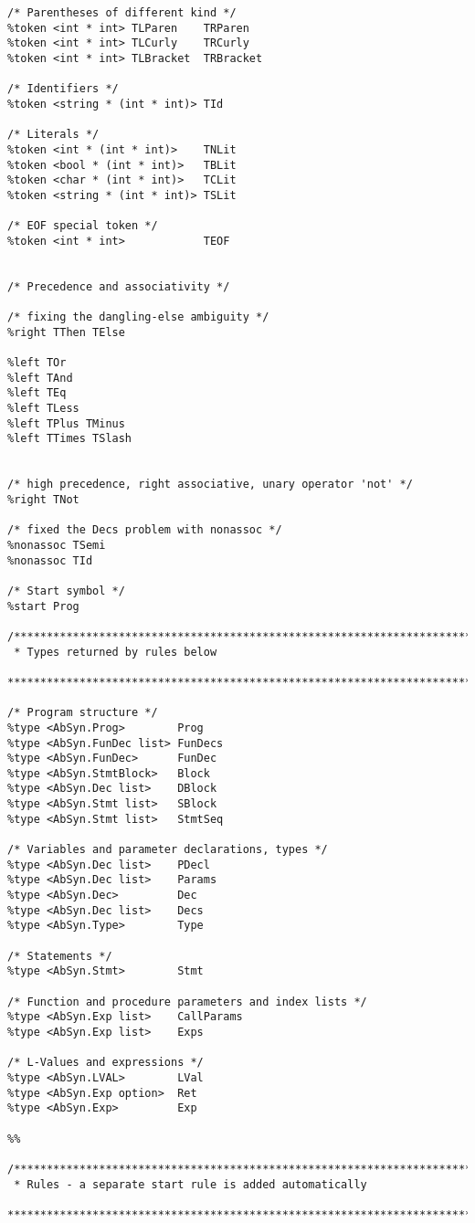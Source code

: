 \begin{lstlisting}[style=MLStyle]
/* Parentheses of different kind */
%token <int * int> TLParen    TRParen
%token <int * int> TLCurly    TRCurly
%token <int * int> TLBracket  TRBracket

/* Identifiers */
%token <string * (int * int)> TId 

/* Literals */
%token <int * (int * int)>    TNLit
%token <bool * (int * int)>   TBLit
%token <char * (int * int)>   TCLit
%token <string * (int * int)> TSLit

/* EOF special token */
%token <int * int>            TEOF


/* Precedence and associativity */

/* fixing the dangling-else ambiguity */
%right TThen TElse 

%left TOr
%left TAnd
%left TEq 
%left TLess
%left TPlus TMinus
%left TTimes TSlash


/* high precedence, right associative, unary operator 'not' */
%right TNot

/* fixed the Decs problem with nonassoc */ 
%nonassoc TSemi
%nonassoc TId

/* Start symbol */
%start Prog

/******************************************************************************
 * Types returned by rules below 
 *****************************************************************************/

/* Program structure */
%type <AbSyn.Prog>        Prog
%type <AbSyn.FunDec list> FunDecs
%type <AbSyn.FunDec>      FunDec
%type <AbSyn.StmtBlock>   Block
%type <AbSyn.Dec list>    DBlock
%type <AbSyn.Stmt list>   SBlock
%type <AbSyn.Stmt list>   StmtSeq

/* Variables and parameter declarations, types */
%type <AbSyn.Dec list>    PDecl
%type <AbSyn.Dec list>    Params
%type <AbSyn.Dec>         Dec
%type <AbSyn.Dec list>    Decs
%type <AbSyn.Type>        Type

/* Statements */
%type <AbSyn.Stmt>        Stmt

/* Function and procedure parameters and index lists */
%type <AbSyn.Exp list>    CallParams
%type <AbSyn.Exp list>    Exps

/* L-Values and expressions */
%type <AbSyn.LVAL>        LVal
%type <AbSyn.Exp option>  Ret
%type <AbSyn.Exp>         Exp

%%

/******************************************************************************
 * Rules - a separate start rule is added automatically
 *****************************************************************************/


\end{lstlisting}
